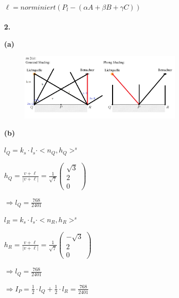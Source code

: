 \documentclass[fleqn]{article}
\begin{document}
\qquad $\ell = norminiert(P_l - (\alpha A+\beta B + \gamma C))$
\\
\\
\indent\textbf{2.}

\indent\indent\textbf{(a)}

\begin{figure}[htb]
    \centering
    \includegraphics[width=0.7\textwidth]{123.png}
\end{figure}

\indent\indent\textbf{(b)}

\begin{center}

$l_Q=k_s \cdot l_s \cdot <n_Q,h_Q>^s$

$h_Q = \frac{v+\ell}{|v+\ell|} = \frac{1}{\sqrt{7}}\begin{pmatrix}\sqrt{3}\\2\\0\end{pmatrix}$

$\Rightarrow l_Q=\frac{768}{2401}$

$l_R=k_s\cdot l_s \cdot<n_R, h_R>^s$

$h_R=\frac{v+\ell}{|v+\ell|} = \frac{1}{\sqrt{7}}\begin{pmatrix}-\sqrt{3}\\2\\0\end{pmatrix}$

$\Rightarrow l_Q=\frac{768}{2401}$   

$\Rightarrow I_P=\frac{1}{2}\cdot l_Q + \frac{1}{2}\cdot l_R = \frac{768}{2401}$

\end{center}
\end{document}
